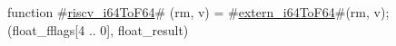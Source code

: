 function #\hyperref[sailRISCVzriscvzyi64ToF64]{riscv\_i64ToF64}# (rm, v) = {
  #\hyperref[sailRISCVzexternzyi64ToF64]{extern\_i64ToF64}#(rm, v);
  (float_fflags[4 .. 0], float_result)
}

